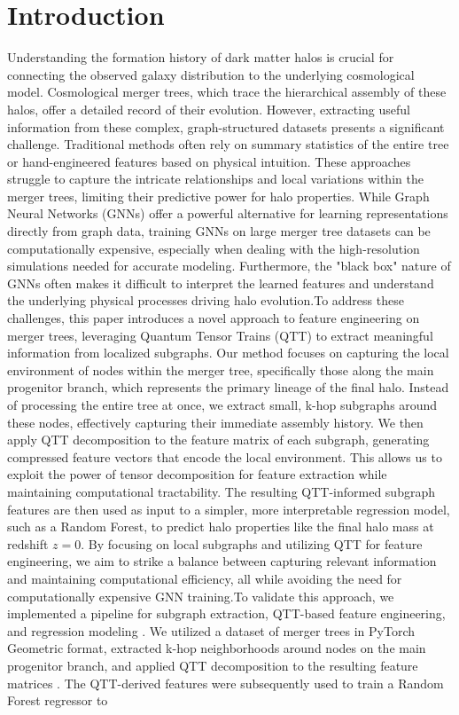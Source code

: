 \documentclass[twocolumn]{aastex631}
\begin{document}
\section{Introduction}
\label{sec:intro}
Understanding the formation history of dark matter halos is crucial for connecting the observed galaxy distribution to the underlying cosmological model. Cosmological merger trees, which trace the hierarchical assembly of these halos, offer a detailed record of their evolution. However, extracting useful information from these complex, graph-structured datasets presents a significant challenge. Traditional methods often rely on summary statistics of the entire tree or hand-engineered features based on physical intuition. These approaches struggle to capture the intricate relationships and local variations within the merger trees, limiting their predictive power for halo properties. While Graph Neural Networks (GNNs) offer a powerful alternative for learning representations directly from graph data, training GNNs on large merger tree datasets can be computationally expensive, especially when dealing with the high-resolution simulations needed for accurate modeling. Furthermore, the "black box" nature of GNNs often makes it difficult to interpret the learned features and understand the underlying physical processes driving halo evolution.To address these challenges, this paper introduces a novel approach to feature engineering on merger trees, leveraging Quantum Tensor Trains (QTT) to extract meaningful information from localized subgraphs. Our method focuses on capturing the local environment of nodes within the merger tree, specifically those along the main progenitor branch, which represents the primary lineage of the final halo. Instead of processing the entire tree at once, we extract small, k-hop subgraphs around these nodes, effectively capturing their immediate assembly history. We then apply QTT decomposition to the feature matrix of each subgraph, generating compressed feature vectors that encode the local environment. This allows us to exploit the power of tensor decomposition for feature extraction while maintaining computational tractability. The resulting QTT-informed subgraph features are then used as input to a simpler, more interpretable regression model, such as a Random Forest, to predict halo properties like the final halo mass at redshift \(z=0\). By focusing on local subgraphs and utilizing QTT for feature engineering, we aim to strike a balance between capturing relevant information and maintaining computational efficiency, all while avoiding the need for computationally expensive GNN training.To validate this approach, we implemented a pipeline for subgraph extraction, QTT-based feature engineering, and regression modeling \citep{jespersen2022textttmangrovelearninggalaxyproperties,jung2024mergertreebasedgalaxymatching}. We utilized a dataset of merger trees in PyTorch Geometric format, extracted k-hop neighborhoods around nodes on the main progenitor branch, and applied QTT decomposition to the resulting feature matrices \citep{jespersen2022textttmangrovelearninggalaxyproperties,jung2024mergertreebasedgalaxymatching}. The QTT-derived features were subsequently used to train a Random Forest regressor to 
\end{document}
